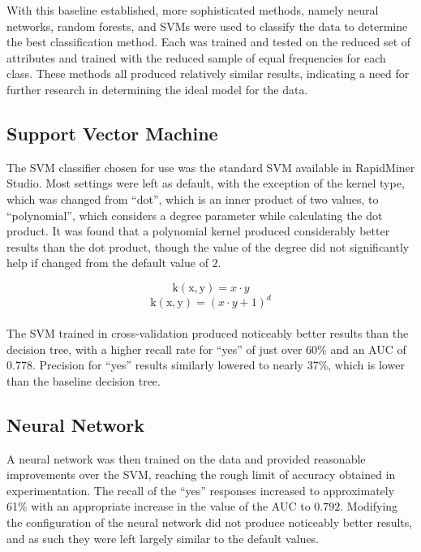 \documentclass[prodmode]{acmsmall} %
\begin{document}
With this baseline established, more sophisticated methods, namely neural
networks, random forests, and SVMs were used to classify the data to determine
the best classification method. Each was trained and tested on the reduced set
of attributes and trained with the reduced sample of equal frequencies for each
class. These methods all produced relatively similar results, indicating a need
for further research in determining the ideal model for the data.

\subsection{Support Vector Machine}
The SVM classifier chosen for use was the standard SVM available in RapidMiner
Studio. Most settings were left as default, with the exception of the kernel
type, which was changed from ``dot'', which is an inner product of two values,
to ``polynomial'', which considers a degree parameter while calculating the dot
product. It was found that a polynomial kernel produced considerably better
results than the dot product, though the value of the degree did not
significantly help if changed from the default value of $2$.

$$\mathrm{k(x,y)} = x \cdot y$$
$$\mathrm{k(x,y)} = (x \cdot y + 1)^d$$ \\

The SVM trained in cross-validation produced noticeably better results than the
decision tree, with a higher recall rate for ``yes'' of just over 60\% and an
AUC of $0.778$. Precision for ``yes'' results similarly lowered to nearly 37\%,
which is lower than the baseline decision tree.

\begin{table}[!t]
\end{table}

\subsection{Neural Network}
A neural network was then trained on the data and provided reasonable
improvements over the SVM, reaching the rough limit of accuracy obtained in
experimentation. The recall of the ``yes'' responses increased to approximately
61\% with an appropriate increase in the value of the AUC to $0.792$. Modifying
the configuration of the neural network did not produce noticeably better
results, and as such they were left largely similar to the default values.
\end{document}
